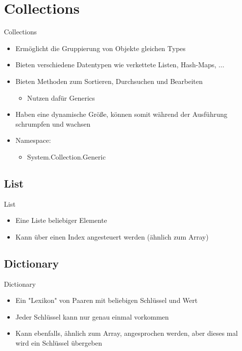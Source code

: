 \section{Collections}
\begin{frame}{Collections}
	\begin{itemize}
		\item Ermöglicht die Gruppierung von Objekte gleichen Types
		\item Bieten verschiedene Datentypen wie verkettete Listen, Hash-Maps, ...
		\item Bieten Methoden zum Sortieren, Durchsuchen und Bearbeiten
		\begin{itemize}
			\item Nutzen dafür Generics
		\end{itemize}
		\item Haben eine dynamische Größe, können somit während der Ausführung schrumpfen und wachsen
		\item Namespace:
		\begin{itemize}			
			\item \alert{System.Collection.Generic}
		\end{itemize}
	\end{itemize}
\end{frame}

\subsection{List}
\begin{frame}{List}
	\begin{itemize}
		\item Eine Liste beliebiger Elemente
		\item Kann über einen Index angesteuert werden (ähnlich zum Array)
	\end{itemize}
	
\end{frame}

\subsection{Dictionary}
\begin{frame}{Dictionary}
	\begin{itemize}
		\item Ein "Lexikon" von Paaren mit beliebigen Schlüssel und Wert
		\item Jeder Schlüssel kann nur genau einmal vorkommen
		\item Kann ebenfalls, ähnlich zum Array, angesprochen werden, aber dieses mal wird ein Schlüssel übergeben
	\end{itemize}
	
\end{frame}

